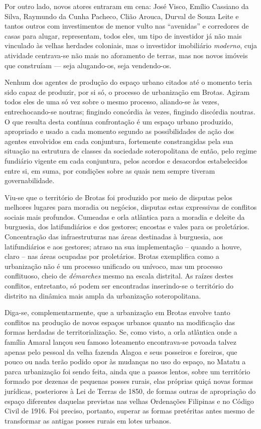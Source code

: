 Por outro lado, novos atores entraram em cena: José Visco, Emílio Cassiano da Silva, Raymundo da Cunha Pacheco, Clião Arouca, Durval de Souza Leite e tantos outros com investimentos de menor vulto nas ``avenidas'' e corredores de casas para alugar, representam, todos eles, um tipo de investidor já não mais vinculado às velhas herdades coloniais, mas o investidor imobiliário \textit{moderno}, cuja atividade centrava-se não mais no aforamento de terras, mas nos novos imóveis que construíam --- seja alugando-os, seja vendendo-os.

Nenhum dos agentes de produção do espaço urbano citados até o momento teria sido capaz de produzir, por si só, o processo de urbanização em Brotas. Agiram todos eles de uma só vez sobre o mesmo processo, aliando-se às vezes, entrechocando-se noutras; fingindo concórdia às vezes, fingindo discórdia noutras. O que resulta desta contínua confrontação é um espaço urbano produzido, apropriado e usado a cada momento segundo as possibilidades de ação dos agentes envolvidos em cada conjuntura, fortemente constrangidas pela sua situação na estrutura de classes da sociedade soteropolitana de então, pelo regime fundiário vigente em cada conjuntura, pelos acordos e desacordos estabelecidos entre si, em suma, por condições sobre as quais nem sempre tiveram governabilidade.

Viu-se que o território de Brotas foi produzido por meio de disputas pelos melhores lugares para moradia ou negócios, disputas estas expressivas de conflitos sociais mais profundos. Cumeadas e orla atlântica para a moradia e deleite da burguesia, dos latifundiários e dos gestores; encostas e vales para os proletários. Concentração das infraestruturas nas áreas destinadas à burguesia, aos latifundiários e aos gestores; atraso na sua implementação – quando a houve, claro – nas áreas ocupadas por proletários. Brotas exemplifica como a urbanização não é um processo unificado ou unívoco, mas um processo conflituoso, cheio de \textit{démarches} mesmo na escala distrital. As raízes destes conflitos, entretanto, só podem ser encontradas inserindo-se o território do distrito na dinâmica mais ampla da urbanização soteropolitana.

Diga-se, complementarmente, que a urbanização em Brotas envolve tanto conflitos na produção de novos espaços urbanos quanto na modificação das formas herdadas de territorialização. Se, como visto, a orla atlântica onde a família Amaral lançou seu famoso loteamento encontrava-se povoada talvez apenas pelo pessoal da velha fazenda Alagoa e seus posseiros e foreiros, que pouco ou nada terão podido opor às mudanças no uso do espaço, no Matatu a parca urbanização foi sendo feita, ainda que a passos lentos, sobre um território formado por dezenas de pequenas posses rurais, elas próprias quiçá novas formas jurídicas, posteriores à Lei de Terras de 1850, de formas outras de apropriação do espaço diferentes daquelas previstas nas velhas Ordenações Filipinas e no Código Civil de 1916. Foi preciso, portanto, superar as formas pretéritas antes mesmo de transformar as antigas posses rurais em lotes urbanos.

